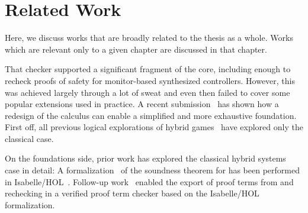 \documentclass[12pt]{cmuthesis}
\theoremstyle{definition}
\theoremstyle{remark}
\newcommand{\Isabelle}{Isabelle/HOL\xspace}
\begin{document}
\section{Related Work}
Here, we discuss works that are broadly related to the thesis as a whole.
Works which are relevant only to a given chapter are discussed in that chapter.

That checker supported a significant fragment of the \KeYmaeraX core, including enough to recheck proofs of safety for monitor-based synthesized controllers.
However, this was achieved largely through a lot of sweat and even then failed to cover some popular extensions used in practice.
A recent submission~\cite{hilbert-epsilons} has shown how a redesign of the \dL calculus can enable a simplified and more exhaustive foundation.
First off, all previous logical explorations of hybrid games~\cite{DBLP:conf/cade/QueselP12,DBLP:journals/tocl/Platzer15,DBLP:journals/tocl/Platzer17,DBLP:conf/cade/Platzer18} have explored only the classical case.


On the foundations side, prior work has explored the classical hybrid systems case in detail:
A formalization~\cite{DBLP:conf/cpp/BohrerRVVP17} of the soundness theorem for \dL has been performed in \Isabelle~\cite{DBLP:books/sp/NipkowPW02}.
Follow-up work~\cite{DBLP:conf/pldi/BohrerTMMP18} enabled the export of proof terms from \KeYmaeraX and rechecking in a verified proof term checker based on the \Isabelle formalization.
\end{document}
